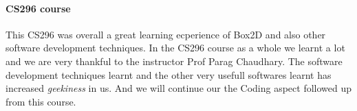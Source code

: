 \documentclass[11pt]{article}
\begin{document}
\paragraph{CS296 course}
This CS296 was overall a great learning ecperience of Box2D and also other software development techniques. In the CS296 course as a whole we learnt a lot and we are very thankful to the instructor Prof Parag Chaudhary\cite{sir}. The software development techniques learnt and the other very usefull softwares learnt has increased \emph{geekiness} in us. And we will continue our the Coding aspect followed up from this course.




\end{document}
